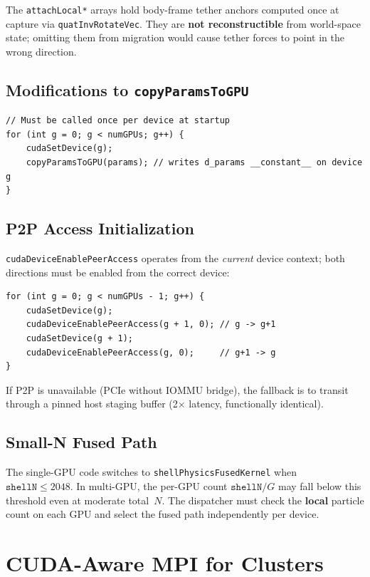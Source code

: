 \documentclass[conference]{IEEEtran}
\begin{document}
The \texttt{attachLocal*} arrays hold body-frame tether anchors computed
once at capture via \texttt{quatInvRotateVec}. They are \textbf{not
reconstructible} from world-space state; omitting them from migration would
cause tether forces to point in the wrong direction.

\subsection{Modifications to \texttt{copyParamsToGPU}}

\begin{lstlisting}
// Must be called once per device at startup
for (int g = 0; g < numGPUs; g++) {
    cudaSetDevice(g);
    copyParamsToGPU(params); // writes d_params __constant__ on device g
}
\end{lstlisting}

\subsection{P2P Access Initialization}

\texttt{cudaDeviceEnablePeerAccess} operates from the \emph{current} device
context; both directions must be enabled from the correct device:

\begin{lstlisting}
for (int g = 0; g < numGPUs - 1; g++) {
    cudaSetDevice(g);
    cudaDeviceEnablePeerAccess(g + 1, 0); // g -> g+1
    cudaSetDevice(g + 1);
    cudaDeviceEnablePeerAccess(g, 0);     // g+1 -> g
}
\end{lstlisting}

If P2P is unavailable (PCIe without IOMMU bridge), the fallback is to
transit through a pinned host staging buffer (2$\times$ latency, functionally
identical).

\subsection{Small-N Fused Path}

The single-GPU code switches to \texttt{shellPhysicsFusedKernel} when
$\texttt{shellN} \le 2048$. In multi-GPU, the per-GPU count
$\texttt{shellN}/G$ may fall below this threshold even at moderate total~$N$.
The dispatcher must check the \textbf{local} particle count on each GPU and
select the fused path independently per device.

\section{CUDA-Aware MPI for Clusters}
\label{sec:mpi}
\end{document}
